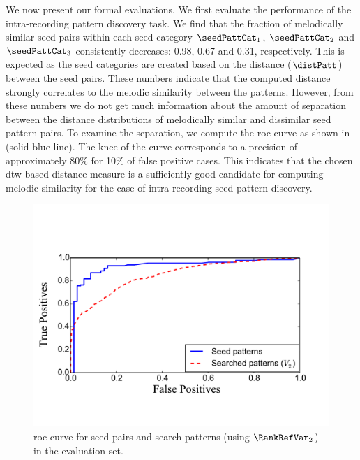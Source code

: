 We now present our formal evaluations. We first evaluate the performance of the intra-recording pattern discovery task. We find that the fraction of melodically similar seed pairs within each seed category $\seedPattCat_1$, $\seedPattCat_2$ and $\seedPattCat_3$ consistently decreases: 0.98, 0.67 and 0.31, respectively. This is expected as the seed categories are created based on the distance ($\distPatt$) between the seed pairs. These numbers indicate that the computed distance strongly correlates to the melodic similarity between the patterns. However, from these numbers we do not get much information about the amount of separation between the distance distributions of melodically similar and dissimilar seed pattern pairs. To examine the separation, we compute the \acrshort{roc} curve as shown in~ (solid blue line). The knee of the curve corresponds to a precision of approximately 80\% for 10\% of false positive cases. This indicates that the chosen \gls{dtw}-based distance measure is a sufficiently good candidate for computing melodic similarity for the case of intra-recording seed pattern discovery. 


\begin{figure}
	\begin{center}
		\includegraphics[width=\figSizeSeventy]{ch06_patterns/figures/discovery/seedROC.pdf}
	\end{center}
	\caption[\acrshort{roc} curve for seed pairs and search patterns]{\acrshort{roc} curve for seed pairs and search patterns (using $\RankRefVar_2$) in the evaluation set.}%
	\label{fig:combinedROCPatternDiscovery}
\end{figure}


